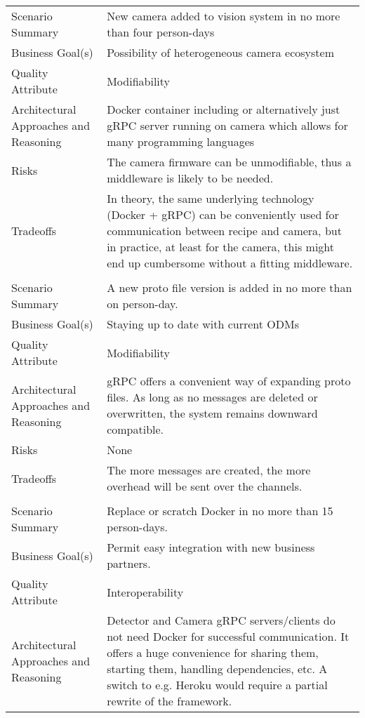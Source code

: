 {\begin{longtable}{| P{0.2\textwidth} | P{0.74\textwidth} |}
 \\ \hline
Scenario Summary & New camera added to vision system in no more than four person-days\\ \hline
Business Goal(s) & Possibility of heterogeneous camera ecosystem\\ \hline
Quality Attribute & Modifiability\\ \hline
Architectural Approaches and Reasoning & Docker container including or alternatively just gRPC server running on camera which allows for many programming languages \\ \hline
Risks &  The camera firmware can be unmodifiable, thus a middleware is likely to be needed. \\ \hline
Tradeoffs & In theory, the same underlying technology (Docker + gRPC) can be conveniently used for communication between recipe and camera, but in practice, at least for the camera, this might end up cumbersome without a fitting middleware. \\ \hline
{}
 \\ \hline
Scenario Summary & A new proto file version is added in no more than on person-day.\\ \hline
Business Goal(s) & Staying up to date with current ODMs\\ \hline
Quality Attribute & Modifiability\\ \hline
Architectural Approaches and Reasoning & gRPC offers a convenient way of expanding proto files. As long as no messages are deleted or overwritten, the system remains downward compatible.\\ \hline
Risks &  None\\ \hline
Tradeoffs &  The more messages are created, the more overhead will be sent over the channels.\\ \hline
{}
 \\ \hline
Scenario Summary & Replace or scratch Docker in no more than 15 person-days.\\ \hline
Business Goal(s) & Permit easy integration with new business partners. \\ \hline
Quality Attribute & Interoperability\\ \hline
Architectural Approaches and Reasoning & Detector and Camera gRPC servers/clients do not need Docker for successful communication. It offers a huge convenience for sharing them, starting them, handling dependencies, etc. A switch to e.g. Heroku would require a partial rewrite of the framework.\\ \hline

\end{longtable}}
